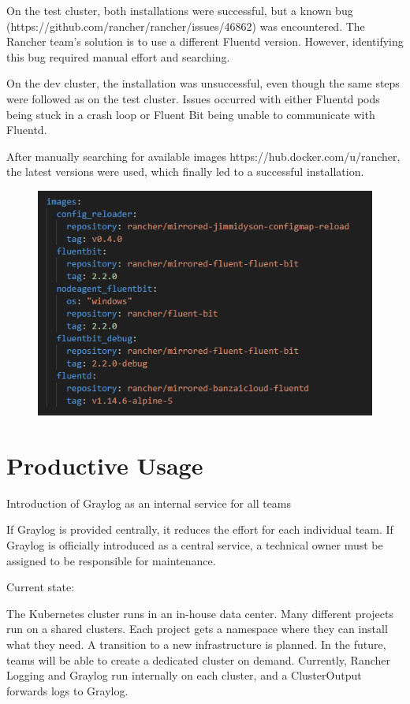 \documentclass[../main.tex]{subfiles}
\begin{document}
On the test cluster, both installations were successful, but a known bug 
(https://github.com/rancher/rancher/issues/46862) was encountered. The Rancher team’s solution is to use a different Fluentd version. However, identifying this bug required manual effort and searching.  

On the dev cluster, the installation was unsuccessful, even though the same steps were followed as on the test cluster. Issues occurred with either Fluentd pods being stuck in a crash loop or Fluent Bit being unable to communicate with Fluentd. 

After manually searching for available images https://hub.docker.com/u/rancher, the latest versions were used, which finally led to a successful installation.

\begin{figure}[h]
        \centering
        \includegraphics[]{img/4-results/values_images.png}
        \caption{ }
        \label{fig:values_images}
\end{figure}

\section{Productive Usage}

Introduction of Graylog as an internal service for all teams

If Graylog is provided centrally, it reduces the effort for each individual team. If Graylog is officially introduced as a central service, a technical owner must be assigned to be responsible for maintenance.

Current state:

The Kubernetes cluster runs in an in-house data center. Many different projects run on a shared clusters. Each project gets a namespace where they can install what they need. A transition to a new infrastructure is planned. In the future, teams will be able to create a dedicated cluster on demand. Currently, Rancher Logging and Graylog run internally on each cluster, and a ClusterOutput forwards logs to Graylog.
\end{document}
